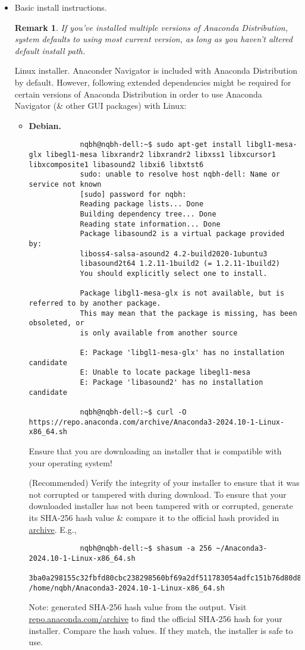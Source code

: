 \documentclass{article}
\newtheorem{remark}{Remark}
\begin{document}
\begin{itemize}
	\item {\sf Basic install instructions.}
	
	\begin{remark}
		If you've installed multiple versions of Anaconda Distribution, system defaults to using most current version, as long as you haven't altered default install path.
	\end{remark}
	{\sf Linux installer.} Anaconder Navigator is included with Anaconda Distribution by default. However, following extended dependencies might be required for certain versions of Anaconda Distribution in order to use Anaconda Navigator (\& other GUI packages) with Linux:
	\begin{itemize}
		\item {\bf Debian.}
		\begin{verbatim}
			nqbh@nqbh-dell:~$ sudo apt-get install libgl1-mesa-glx libegl1-mesa libxrandr2 libxrandr2 libxss1 libxcursor1 libxcomposite1 libasound2 libxi6 libxtst6
			sudo: unable to resolve host nqbh-dell: Name or service not known
			[sudo] password for nqbh: 
			Reading package lists... Done
			Building dependency tree... Done
			Reading state information... Done
			Package libasound2 is a virtual package provided by:
			liboss4-salsa-asound2 4.2-build2020-1ubuntu3
			libasound2t64 1.2.11-1build2 (= 1.2.11-1build2)
			You should explicitly select one to install.
			
			Package libgl1-mesa-glx is not available, but is referred to by another package.
			This may mean that the package is missing, has been obsoleted, or
			is only available from another source
			
			E: Package 'libgl1-mesa-glx' has no installation candidate
			E: Unable to locate package libegl1-mesa
			E: Package 'libasound2' has no installation candidate
			
			nqbh@nqbh-dell:~$ curl -O https://repo.anaconda.com/archive/Anaconda3-2024.10-1-Linux-x86_64.sh
		\end{verbatim}
		Ensure that you are downloading an installer that is compatible with your operating system!
		
		(Recommended) Verify the integrity of your installer to ensure that it was not corrupted or tampered with during download. To ensure that your downloaded installer has not been tampered with or corrupted, generate its SHA-256 hash value \& compare it to the official hash provided in \href{https://repo.anaconda.com/archive/}{archive}. E.g.,
		\begin{verbatim}
			nqbh@nqbh-dell:~$ shasum -a 256 ~/Anaconda3-2024.10-1-Linux-x86_64.sh
			3ba0a298155c32fbfd80cbc238298560bf69a2df511783054adfc151b76d80d8  /home/nqbh/Anaconda3-2024.10-1-Linux-x86_64.sh
		\end{verbatim}
		Note: generated SHA-256 hash value from the output. Visit \url{repo.anaconda.com/archive} to find the official SHA-256 hash for your installer. Compare the hash values. If they match, the installer is safe to use.
		

\end{itemize}
\end{itemize}
\end{document}
